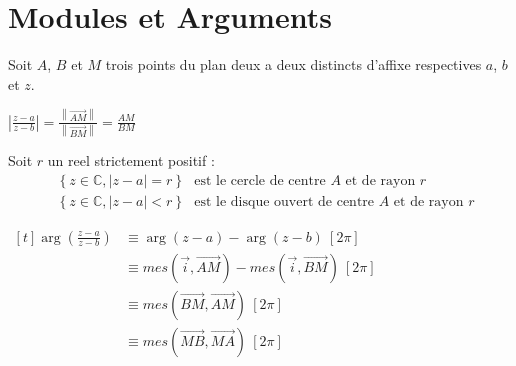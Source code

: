 \documentclass[12pt,twoside,a4paper]{article}
\author{MPSI 2}
\begin{document}
	\maketitle

	\section{Modules et Arguments}
		Soit $A$, $B$ et $M$ trois points du plan deux a deux distincts d'affixe respectives $a$, $b$ et $z$.
		\begin{liste}
			\item $\left|\frac{z-a}{z-b}\right|=\frac{\left\|\vec{AM}\right\|}{\left\|\vec{BM}\right\|}=\frac{AM}{BM}$
			\item Soit $r$ un reel strictement positif :
				$$\begin{aligned}
					&\left\{z\in\mathbb{C},\left|z-a\right|=r\right\}\ \ \ \text{est le cercle de centre }A\text{ et de rayon }r \\
					&\left\{z\in\mathbb{C},\left|z-a\right|<r\right\}\ \ \ \text{est le disque ouvert de centre }A\text{ et de rayon }r
				\end{aligned}$$
			\item $\begin{aligned}[t]
					\arg\left(\frac{z-a}{z-b}\right)&\equiv\arg\left(z-a\right)-\arg\left(z-b\right)\ \left[2\pi\right] \\
													 &\equiv mes\left(\vec{i}, \vec{AM}\right)-mes\left(\vec{i}, \vec{BM}\right)\ \left[2\pi\right] \\
													 &\equiv mes\left(\vec{BM}, \vec{AM}\right)\ \left[2\pi\right] \\
													 &\equiv mes\left(\vec{MB}, \vec{MA}\right)\ \left[2\pi\right]
				\end{aligned}$
		\end{liste}
	
\end{document}
